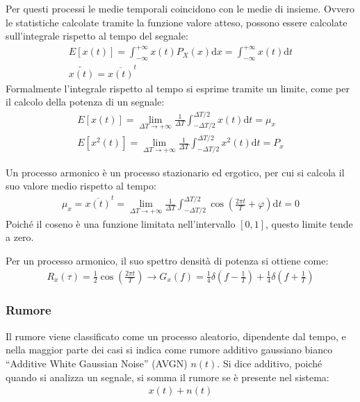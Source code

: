 \documentclass{article}
\newcommand{\df}{\mathrm{d}}
\numberwithin{equation}{subsection}
\begin{document}
Per questi processi le medie temporali coincidono con le medie di insieme. Ovvero le statistiche calcolate tramite la funzione valore atteso, possono essere 
calcolate sull'integrale rispetto al tempo del segnale:
\begin{gather*}
    E[x(t)]=\displaystyle\int_{-\infty}^{+\infty}x(t)P_X(x)\df x=\int_{-\infty}^{+\infty}x(t)\df t\\
    \widetilde{x(t)}=\overline{x(t)}^t
\end{gather*}
Formalmente l'integrale rispetto al tempo si esprime tramite un limite, come per il calcolo della potenza di un segnale:
\begin{gather*}
    E[x(t)]=\lim_{\Delta T\to+\infty}\displaystyle\frac{1}{\Delta T}\int_{-\Delta T/2}^{\Delta T/2}x(t)\df t=\mu_x\\
    E[x^2(t)]=\lim_{\Delta T\to+\infty}\displaystyle\frac{1}{\Delta T}\int_{-\Delta T/2}^{\Delta T/2}x^2(t)\df t=P_x
\end{gather*}


Un processo armonico è un processo stazionario ed ergotico, per cui si calcola il suo valore medio rispetto al tempo:
\begin{gather*}
    \mu_x=\overline{x(t)}^t=\lim_{\Delta T\to+\infty}\displaystyle\frac{1}{\Delta T}\int_{-\Delta T/2}^{\Delta T/2}\cos\left(\frac{2\pi t}{T}+\varphi\right)\df t=0
\end{gather*}
Poiché il coseno è una funzione limitata nell'intervallo $[0,1]$, questo limite tende a zero. 


Per un processo armonico, il suo spettro densità di potenza si ottiene come:
\begin{gather*}
    R_x(\tau)=\displaystyle\frac{1}{2}\cos\left(\frac{2\pi t}{T}\right)\to G_x(f)=\displaystyle\frac{1}{4}\delta\left(f-\frac{1}{T}\right)+\frac{1}{4}\delta\left(f+\frac{1}{T}\right)
\end{gather*}

\subsubsection{Rumore}
Il rumore viene classificato come un processo aleatorio, dipendente dal tempo, e nella maggior parte dei casi si indica come rumore additivo gaussiano bianco 
``Additive White Gaussian Noise'' (AVGN) $n(t)$. 
Si dice additivo, poiché quando si analizza un segnale, si somma il rumore se è presente nel sistema:
\begin{gather*}
    x(t)+n(t)
\end{gather*} 
\end{document}
